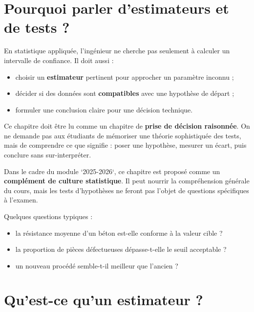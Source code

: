 
\section{Pourquoi parler d'estimateurs et de tests ?}

En statistique appliquée, l'ingénieur ne cherche pas seulement à calculer un intervalle de confiance. Il doit aussi :
\begin{itemize}
    \item choisir un \textbf{estimateur} pertinent pour approcher un paramètre inconnu ;
    \item décider si des données sont \textbf{compatibles} avec une hypothèse de départ ;
    \item formuler une conclusion claire pour une décision technique.
\end{itemize}

\begin{Rmq}
Ce chapitre doit être lu comme un chapitre de \textbf{prise de décision raisonnée}. On ne demande pas aux étudiants de mémoriser une théorie sophistiquée des tests, mais de comprendre ce que signifie : poser une hypothèse, mesurer un écart, puis conclure sans sur-interpréter.
\end{Rmq}

\begin{Rmq}
Dans le cadre du module `2025-2026`, ce chapitre est proposé comme un \textbf{complément de culture statistique}. Il peut nourrir la compréhension générale du cours, mais les tests d'hypothèses ne feront pas l'objet de questions spécifiques à l'examen.
\end{Rmq}

\begin{Ex}
Quelques questions typiques :
\begin{itemize}
    \item la résistance moyenne d'un béton est-elle conforme à la valeur cible ?
    \item la proportion de pièces défectueuses dépasse-t-elle le seuil acceptable ?
    \item un nouveau procédé semble-t-il meilleur que l'ancien ?
\end{itemize}
\end{Ex}

\section{Qu'est-ce qu'un estimateur ?}

